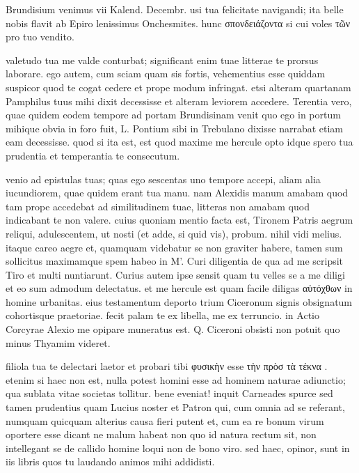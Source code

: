 


 Brundisium venimus vii Kalend. Decembr. usi tua felicitate navigandi; ita belle nobis flavit ab Epiro lenissimus Onchesmites. hunc σπονδειάζοντα si cui voles τῶν pro tuo vendito.

 valetudo tua me valde conturbat; significant enim tuae litterae te prorsus laborare. ego autem, cum sciam quam sis fortis, vehementius esse quiddam suspicor quod te cogat cedere et prope modum infringat. etsi alteram quartanam Pamphilus tuus mihi dixit decessisse et alteram leviorem accedere. Terentia vero, quae quidem eodem tempore ad portam Brundisinam venit quo ego in portum mihique obvia in foro fuit, L. Pontium sibi in Trebulano dixisse narrabat etiam eam decessisse. quod si ita est, est quod maxime me hercule opto idque spero tua prudentia et temperantia te consecutum.

 venio ad epistulas tuas; quas ego sescentas uno tempore accepi, aliam alia iucundiorem, quae quidem erant tua manu. nam Alexidis manum amabam quod tam prope accedebat ad similitudinem tuae, litteras non amabam quod indicabant te non valere. cuius quoniam mentio facta est, Tironem Patris aegrum reliqui, adulescentem, ut nosti (et adde, si quid vis), probum. nihil vidi melius. itaque careo aegre et, quamquam videbatur se non graviter habere, tamen sum sollicitus maximamque spem habeo in M'. Curi diligentia de qua ad me scripsit Tiro et multi nuntiarunt. Curius autem ipse sensit quam tu velles se a me diligi et eo sum admodum delectatus. et me hercule est quam facile diligas αὐτόχθων in homine urbanitas. eius testamentum deporto trium Ciceronum signis obsignatum cohortisque praetoriae. fecit palam te ex libella, me ex terruncio. in Actio Corcyrae Alexio me opipare muneratus est. Q. Ciceroni obsisti non potuit quo minus Thyamim videret.

 filiola tua te delectari laetor et probari tibi φυσικὴν esse τὴν πρὸσ τὰ τέκνα . etenim si haec non est, nulla potest homini esse ad hominem naturae adiunctio; qua sublata vitae societas tollitur. bene eveniat! inquit Carneades spurce sed tamen prudentius quam Lucius noster et Patron qui, cum omnia ad se referant, numquam quicquam alterius causa fieri putent et, cum ea re bonum virum oportere esse dicant ne malum habeat non quo id natura rectum sit, non intellegant se de callido homine loqui non de bono viro. sed haec, opinor, sunt in iis libris quos tu laudando animos mihi addidisti.

